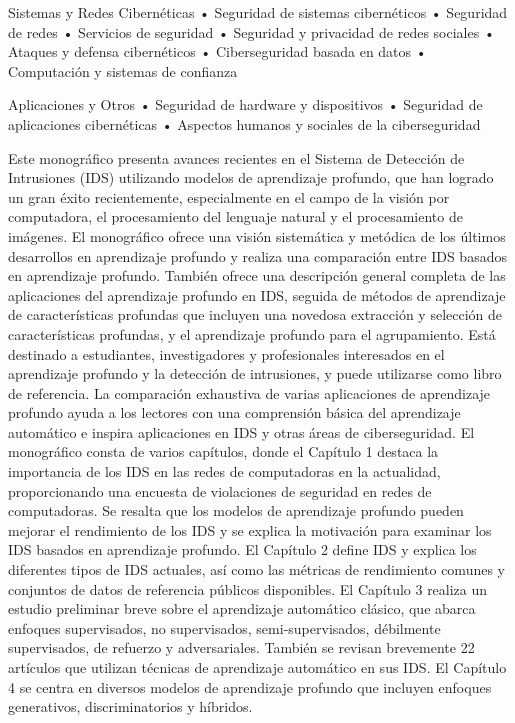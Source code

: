 \documentclass[11pt, a4paper]{article} %
\begin{document}
Sistemas y Redes Cibernéticas
• Seguridad de sistemas cibernéticos
• Seguridad de redes
• Servicios de seguridad
• Seguridad y privacidad de redes sociales
• Ataques y defensa cibernéticos
• Ciberseguridad basada en datos
• Computación y sistemas de confianza

Aplicaciones y Otros
• Seguridad de hardware y dispositivos
• Seguridad de aplicaciones cibernéticas
• Aspectos humanos y sociales de la ciberseguridad





Este monográfico presenta avances recientes en el Sistema de Detección de Intrusiones (IDS) utilizando modelos de aprendizaje profundo, que han logrado un gran éxito recientemente, especialmente en el campo de la visión por computadora, el procesamiento del lenguaje natural y el procesamiento de imágenes. El monográfico ofrece una visión sistemática y metódica de los últimos desarrollos en aprendizaje profundo y realiza una comparación entre IDS basados en aprendizaje profundo. También ofrece una descripción general completa de las aplicaciones del aprendizaje profundo en IDS, seguida de métodos de aprendizaje de características profundas que incluyen una novedosa extracción y selección de características profundas, y el aprendizaje profundo para el agrupamiento.
Está destinado a estudiantes, investigadores y profesionales interesados en el aprendizaje profundo y la detección de intrusiones, y puede utilizarse como libro de referencia. La comparación exhaustiva de varias aplicaciones de aprendizaje profundo ayuda a los lectores con una comprensión básica del aprendizaje automático e inspira aplicaciones en IDS y otras áreas de ciberseguridad.
El monográfico consta de varios capítulos, donde el Capítulo 1 destaca la importancia de los IDS en las redes de computadoras en la actualidad, proporcionando una encuesta de violaciones de seguridad en redes de computadoras. Se resalta que los modelos de aprendizaje profundo pueden mejorar el rendimiento de los IDS y se explica la motivación para examinar los IDS basados en aprendizaje profundo. El Capítulo 2 define IDS y explica los diferentes tipos de IDS actuales, así como las métricas de rendimiento comunes y conjuntos de datos de referencia públicos disponibles.
El Capítulo 3 realiza un estudio preliminar breve sobre el aprendizaje automático clásico, que abarca enfoques supervisados, no supervisados, semi-supervisados, débilmente supervisados, de refuerzo y adversariales. También se revisan brevemente 22 artículos que utilizan técnicas de aprendizaje automático en sus IDS. El Capítulo 4 se centra en diversos modelos de aprendizaje profundo que incluyen enfoques generativos, discriminatorios y híbridos.
\end{document}
